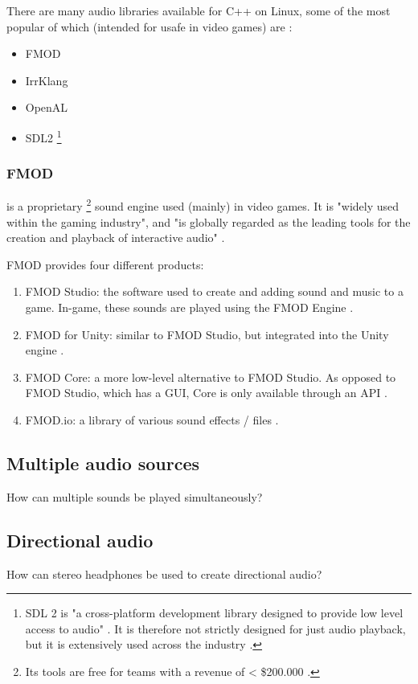 \documentclass{article} %
\begin{document}
There are many audio libraries available for C++ on Linux, some of the most popular of which (intended for usafe in video games) are \cite{Szanto_2018}:
\begin{itemize}
    \item FMOD
    \item IrrKlang
    \item OpenAL
    \item SDL2 \footnote{SDL 2 is "a cross-platform development library designed to provide low level access to audio" \cite{sdl2}. It is therefore not strictly designed for just audio playback, but it is extensively used across the industry \cite{sdl2games}.}
\end{itemize}

\subsubsection{FMOD} is a proprietary \footnote{Its tools are free for teams with a revenue of < \$200.000 \cite{fmodStudio}.} sound engine used (mainly) in video games.
It is "widely used within the gaming industry", and "is globally regarded as the leading tools for the creation and playback of interactive audio" \cite{dolbyFmod}.

FMOD provides four different products:
\begin{enumerate}
    \item FMOD Studio: the software used to create and adding sound and music to a game. In-game, these sounds are played using the FMOD Engine \cite{fmodStudio}.
    \item FMOD for Unity: similar to FMOD Studio, but integrated into the Unity engine \cite{fmodUnity}.
    \item FMOD Core: a more low-level alternative to FMOD Studio. As opposed to FMOD Studio, which has a GUI, Core is only available through an API \cite{fmodCore}.
    \item FMOD.io: a library of various sound effects / files \cite{fmodIo}.
\end{enumerate}


\subsection{Multiple audio sources}
How can multiple sounds be played simultaneously?
\subsection{Directional audio}
How can stereo headphones be used to create directional audio?
\end{document}

